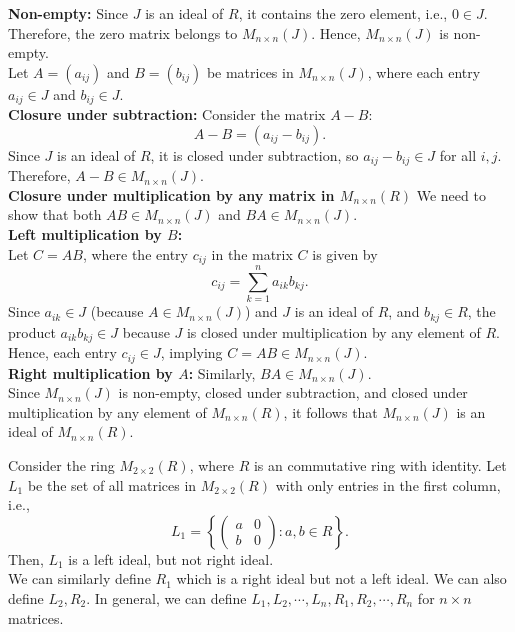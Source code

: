 \begin{explanation}
    \textbf{Non-empty:} Since \( J \) is an ideal of \( R \), it contains the zero element, i.e., \( 0 \in J \). Therefore, the zero matrix belongs to \( M_{n \times n}(J) \). Hence, \( M_{n \times n}(J) \) is non-empty.\\
Let \( A = (a_{ij}) \) and \( B = (b_{ij}) \) be matrices in \( M_{n \times n}(J) \), where each entry \( a_{ij} \in J \) and \( b_{ij} \in J \).\\
\textbf{Closure under subtraction:} Consider the matrix \( A - B \):
\[
A - B = (a_{ij} - b_{ij}).
\]
Since \( J \) is an ideal of \( R \), it is closed under subtraction, so \( a_{ij} - b_{ij} \in J \) for all \( i, j \). Therefore, \( A - B \in M_{n \times n}(J) \).\\
\textbf{Closure under multiplication by any matrix in \( M_{n \times n}(R) \)}
We need to show that both \( AB \in M_{n \times n}(J) \) and \( BA \in M_{n \times n}(J) \).\\
\textbf{Left multiplication by \( B \):}\\
Let \( C = AB \), where the entry \( c_{ij} \) in the matrix \( C \) is given by
\[
c_{ij} = \sum_{k=1}^{n} a_{ik} b_{kj}.
\]
Since \( a_{ik} \in J \) (because \( A \in M_{n \times n}(J) \)) and \( J \) is an ideal of \( R \), and \( b_{kj} \in R \), the product \( a_{ik} b_{kj} \in J \) because \( J \) is closed under multiplication by any element of \( R \). Hence, each entry \( c_{ij} \in J \), implying \( C = AB \in M_{n \times n}(J) \).\\
\textbf{Right multiplication by \( A \):} Similarly, \( BA \in M_{n \times n}(J) \).\\
Since \( M_{n \times n}(J) \) is non-empty, closed under subtraction, and closed under multiplication by any element of \( M_{n \times n}(R) \), it follows that \( M_{n \times n}(J) \) is an ideal of \( M_{n \times n}(R) \).
\end{explanation}
\begin{eg}
    Consider the ring $M_{2\times 2}(R)$, where $R$ is an commutative ring with identity. Let $L_1$ be the set of all matrices in $M_{2 \times 2}(R)$ with only entries in the first column, i.e., 
    \[
    L_1 = \left\{\begin{pmatrix}
    a & 0\\
    b & 0
    \end{pmatrix}: a, b \in R\right\}.
    \]
    Then, $L_1$ is a left ideal, but not right ideal.\\
    We can similarly define $R_1$ which is a right ideal but not a left ideal. We can also define $L_2, R_2$. In general, we can define $L_1, L_2, \cdots, L_n, R_1, R_2, \cdots, R_n$ for $n \times n$ matrices.
\end{eg}
